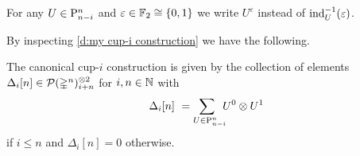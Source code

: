 \begin{notation}
	For any $U \in \mathrm{P}^n_{n-i}$ and $\varepsilon \in {\mathbb{F}_2} \cong \{0,1\}$ we write $U^\varepsilon$ instead of $\operatorname{ind}_U^{-1}(\varepsilon)$.
\end{notation}

By inspecting \cref{d:my cup-i construction} we have the following.

\begin{lemma} \label{l:canonical cup-i construction}
	The canonical cup-$i$ construction is given by the collection of elements $\Delta_i[n] \in \mathcal{P}(\mathbb{\Delta}^n)^{\otimes 2}_{i+n}$ for $i,n \in \mathbb{N}$ with
	\[
	\Delta_i[n] \ =
	\sum_{U \in \mathrm{P}^n_{n-i} \kern-5pt} U^0 \otimes U^1
	\]
	if $i \leq n$ and $\Delta_i[n] = 0$ otherwise.
\end{lemma}